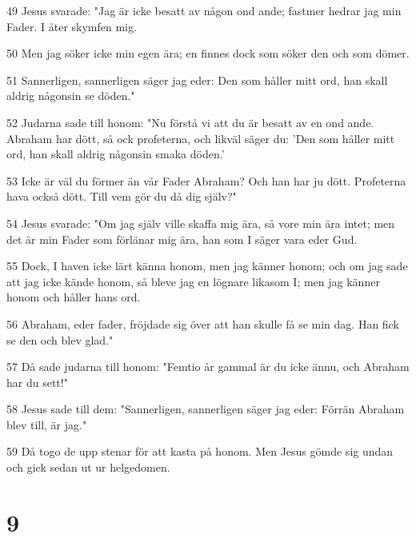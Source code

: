 \par 49 Jesus svarade: "Jag är icke besatt av någon ond ande; fastmer hedrar jag min Fader. I åter skymfen mig.
\par 50 Men jag söker icke min egen ära; en finnes dock som söker den och som dömer.
\par 51 Sannerligen, sannerligen säger jag eder: Den som håller mitt ord, han skall aldrig någonsin se döden."
\par 52 Judarna sade till honom: "Nu förstå vi att du är besatt av en ond ande. Abraham har dött, så ock profeterna, och likväl säger du: 'Den som håller mitt ord, han skall aldrig någonsin smaka döden.'
\par 53 Icke är väl du förmer än vår Fader Abraham? Och han har ju dött. Profeterna hava också dött. Till vem gör du då dig själv?"
\par 54 Jesus svarade: "Om jag själv ville skaffa mig ära, så vore min ära intet; men det är min Fader som förlänar mig ära, han som I säger vara eder Gud.
\par 55 Dock, I haven icke lärt känna honom, men jag känner honom; och om jag sade att jag icke kände honom, så bleve jag en lögnare likasom I; men jag känner honom och håller hans ord.
\par 56 Abraham, eder fader, fröjdade sig över att han skulle få se min dag. Han fick se den och blev glad."
\par 57 Då sade judarna till honom: "Femtio år gammal är du icke ännu, och Abraham har du sett!"
\par 58 Jesus sade till dem: "Sannerligen, sannerligen säger jag eder: Förrän Abraham blev till, är jag."
\par 59 Då togo de upp stenar för att kasta på honom. Men Jesus gömde sig undan och gick sedan ut ur helgedomen.

\chapter{9}

